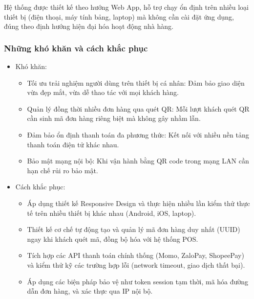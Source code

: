 \documentclass[a4paper]{article}
\begin{document}
\quad Hệ thống được thiết kế theo hướng Web App, hỗ trợ chạy ổn định trên nhiều loại thiết bị (điện thoại, máy tính bảng, laptop) mà không cần cài đặt ứng dụng, đúng theo định hướng hiện đại hóa hoạt động nhà hàng.
\newpage
\subsubsection{Những khó khăn và cách khắc phục}
\begin{itemize}
    \item Khó khăn:
          \begin{itemize}
              \item Tối ưu trải nghiệm người dùng trên thiết bị cá nhân: Đảm bảo giao diện vừa đẹp mắt, vừa dễ thao tác với mọi khách hàng.
              \item Quản lý đồng thời nhiều đơn hàng qua quét QR: Mỗi lượt khách quét QR cần sinh mã đơn hàng riêng biệt mà không gây nhầm lẫn.
              \item Đảm bảo ổn định thanh toán đa phương thức: Kết nối với nhiều nền tảng thanh toán điện tử khác nhau.
              \item Bảo mật mạng nội bộ: Khi vận hành bằng QR code trong mạng LAN cần hạn chế rủi ro bảo mật.
          \end{itemize}
    \item Cách khắc phục:
          \begin{itemize}
              \item Áp dụng thiết kế Responsive Design và thực hiện nhiều lần kiểm thử thực tế trên nhiều thiết bị khác nhau (Android, iOS, laptop).
              \item Thiết kế cơ chế tự động tạo và quản lý mã đơn hàng duy nhất (UUID) ngay khi khách quét mã, đồng bộ hóa với hệ thống POS.
              \item Tích hợp các API thanh toán chính thống (Momo, ZaloPay, ShopeePay) và kiểm thử kỹ các trường hợp lỗi (network timeout, giao dịch thất bại).
              \item Áp dụng các biện pháp bảo vệ như token session tạm thời, mã hóa đường dẫn đơn hàng, và xác thực qua IP nội bộ.
          \end{itemize}
\end{itemize}
\end{document}
